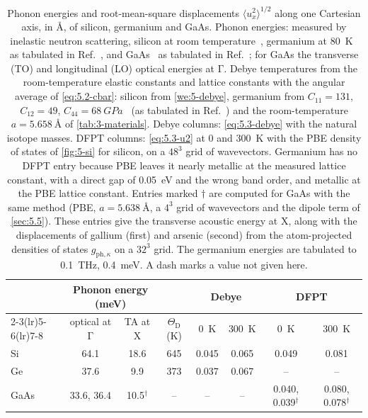 \begin{table}[tbp]
  \centering
  \small
  \caption{Phonon energies and root-mean-square displacements $\langle u_x^2\rangle^{1/2}$ along one Cartesian axis, in \AA, of silicon, germanium and GaAs. Phonon energies: measured by inelastic neutron scattering, silicon at room temperature~\cite{dolling1963inelastic,nilsson1972study}, germanium at \SI{80}{K}~\cite{nilsson1971phonon} as tabulated in Ref.~\cite[Table~IV]{haxhijaj2026lattice}, and GaAs~\cite{strauch1990phonon} as tabulated in Ref.~\cite[Table~I]{dehghani2025influence}; for GaAs the transverse (TO) and longitudinal (LO) optical energies at $\mathrm{\Gamma}$. Debye temperatures from the room-temperature elastic constants and lattice constants with the angular average of \cref{eq:5.2-cbar}: silicon from \cref{we:5-debye}, germanium from $C_{11} = 131$, $C_{12} = 49$, $C_{44} = \SI{68}{GPa}$~\cite{mcskimin1963elastic} (as tabulated in Ref.~\cite[Table~III]{haxhijaj2026lattice}) and the room-temperature $a = \SI{5.658}{\angstrom}$ of \cref{tab:3-materials}. Debye columns: \cref{eq:5.3-debye} with the natural isotope masses. DFPT columns: \cref{eq:5.3-u2} at 0 and \SI{300}{K} with the PBE density of states of \cref{fig:5-si} for silicon, on a $48^3$ grid of wavevectors. Germanium has no DFPT entry because PBE leaves it nearly metallic at the measured lattice constant, with a direct gap of \SI{0.05}{eV} and the wrong band order, and metallic at the PBE lattice constant. Entries marked $\dagger$ are computed for GaAs with the same method (PBE, $a = \SI{5.638}{\angstrom}$, a $4^3$ grid of wavevectors and the dipole term of \cref{sec:5.5}). These entries give the transverse acoustic energy at X, along with the displacements of gallium (first) and arsenic (second) from the atom-projected densities of states $g_{\mathrm{ph},\kappa}$ on a $32^3$ grid. The germanium energies are tabulated to \SI{0.1}{THz}, \SI{0.4}{meV}. A dash marks a value not given here.}
  \label{tab:5-phonons}
  \begin{tabular}{@{}lccccccc@{}}
    \toprule
    & \multicolumn{2}{c}{Phonon energy (meV)} & & \multicolumn{2}{c}{Debye} & \multicolumn{2}{c}{DFPT} \\
    \cmidrule(lr){2-3}\cmidrule(lr){5-6}\cmidrule(lr){7-8}
    & optical at $\mathrm{\Gamma}$ & TA at X & $\Theta_{\mathrm{D}}$ (K) & \SI{0}{K} & \SI{300}{K} & \SI{0}{K} & \SI{300}{K} \\
    \midrule
    Si & 64.1 & 18.6 & 645 & 0.045 & 0.065 & 0.049 & 0.081 \\
    Ge & 37.6 & 9.9 & 373 & 0.037 & 0.067 & -- & -- \\
    GaAs & 33.6, 36.4 & 10.5$^\dagger$ & -- & -- & -- & 0.040, 0.039$^\dagger$ & 0.080, 0.078$^\dagger$ \\
    \bottomrule
  \end{tabular}
\end{table}
